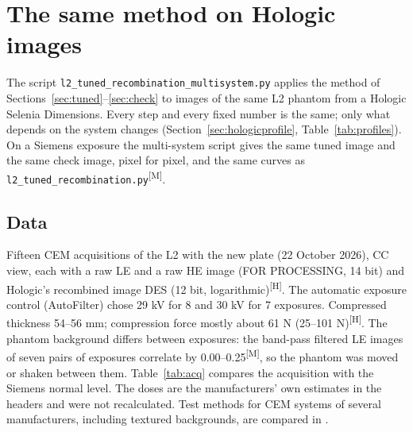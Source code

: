 \documentclass[11pt,a4paper]{article}
\newcommand{\M}{\textsuperscript{[M]}}
\newcommand{\Hd}{\textsuperscript{[H]}}
\newcommand{\code}[1]{\texttt{#1}}
\begin{document}
\section{The same method on Hologic images}\label{sec:hologic}

The script \code{l2\_tuned\_recombination\_multisystem.py} applies the method of Sections~\ref{sec:tuned}--\ref{sec:check}
to images of the same L2 phantom from a Hologic Selenia Dimensions. Every step and every fixed number is the same;
only what depends on the system changes (Section~\ref{sec:hologicprofile}, Table~\ref{tab:profiles}). On a Siemens
exposure the multi-system script gives the same tuned image and the same check image, pixel for pixel, and the same
curves as \code{l2\_tuned\_recombination.py}\M.

\subsection{Data}
Fifteen CEM acquisitions of the L2 with the new plate (22 October 2026), CC view, each with a raw LE and a raw HE image
(FOR PROCESSING, 14 bit) and Hologic's recombined image DES (12 bit, logarithmic)\Hd. The automatic exposure control
(AutoFilter) chose 29 kV for 8 and 30 kV for 7 exposures. Compressed thickness 54--56 mm; compression force mostly
about 61 N (25--101 N)\Hd. The phantom background differs between exposures: the band-pass filtered LE images of seven
pairs of exposures correlate by 0.00--0.25\M, so the phantom was moved or shaken between them. Table~\ref{tab:acq}
compares the acquisition with the Siemens normal level. The doses are the manufacturers' own estimates in the headers
and were not recalculated. Test methods for CEM systems of several manufacturers, including textured backgrounds,
are compared in \cite{cockmartin2023}.
\end{document}
